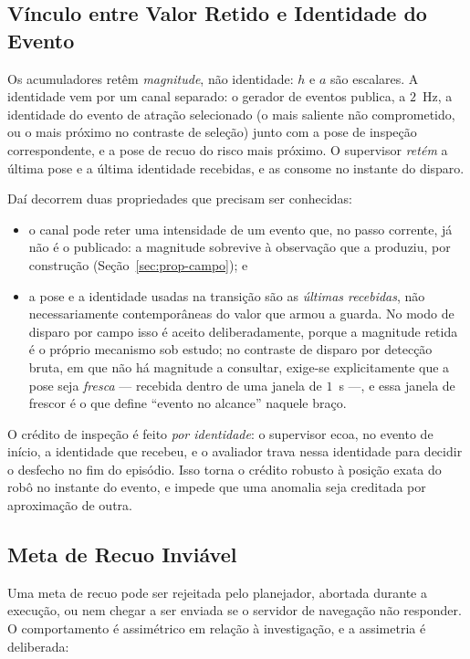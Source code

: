 \subsection{Vínculo entre Valor Retido e Identidade do Evento}

Os acumuladores retêm \emph{magnitude}, não identidade: $h$ e $a$ são escalares. A
identidade vem por um canal separado: o gerador de eventos publica, a $2$~Hz, a
identidade do evento de atração selecionado (o mais saliente não comprometido, ou o
mais próximo no contraste de seleção) junto com a pose de inspeção correspondente, e a
pose de recuo do risco mais próximo. O supervisor \emph{retém} a última pose e a última
identidade recebidas, e as consome no instante do disparo.

Daí decorrem duas propriedades que precisam ser conhecidas:

\begin{itemize}
    \item o canal pode reter uma intensidade de um evento que, no passo corrente, já não
    é o publicado: a magnitude sobrevive à observação que a produziu, por construção
    (Seção~\ref{sec:prop-campo}); e
    \item a pose e a identidade usadas na transição são as \emph{últimas recebidas}, não
    necessariamente contemporâneas do valor que armou a guarda. No modo de disparo por
    campo isso é aceito deliberadamente, porque a magnitude retida é o próprio mecanismo
    sob estudo; no contraste de disparo por detecção bruta, em que não há magnitude a
    consultar, exige-se explicitamente que a pose seja \emph{fresca} --- recebida dentro
    de uma janela de $1$~s ---, e essa janela de frescor é o que define ``evento no
    alcance'' naquele braço.
\end{itemize}

O crédito de inspeção é feito \emph{por identidade}: o supervisor ecoa, no evento de
início, a identidade que recebeu, e o avaliador trava nessa identidade para decidir o
desfecho no fim do episódio. Isso torna o crédito robusto à posição exata do robô no
instante do evento, e impede que uma anomalia seja creditada por aproximação de outra.

\subsection{Meta de Recuo Inviável}

Uma meta de recuo pode ser rejeitada pelo planejador, abortada durante a execução, ou
nem chegar a ser enviada se o servidor de navegação não responder. O comportamento é
assimétrico em relação à investigação, e a assimetria é deliberada:

